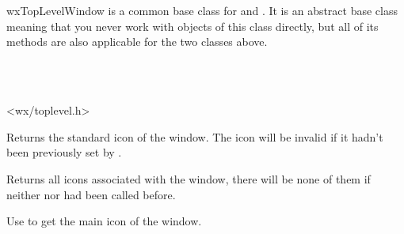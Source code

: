 
\section{}\label{wxtoplevelwindow}

wxTopLevelWindow is a common base class for  and 
. It is an abstract base class meaning that you never
work with objects of this class directly, but all of its methods are also
applicable for the two classes above.


\\
\\


<wx/toplevel.h>




\label{wxtoplevelwindowgeticon}


Returns the standard icon of the window. The icon will be invalid if it hadn't
been previously set by .




\label{wxtoplevelwindowgeticons}


Returns all icons associated with the window, there will be none of them if
neither  nor 
 had been called before.

Use  to get the main icon of the
window.

